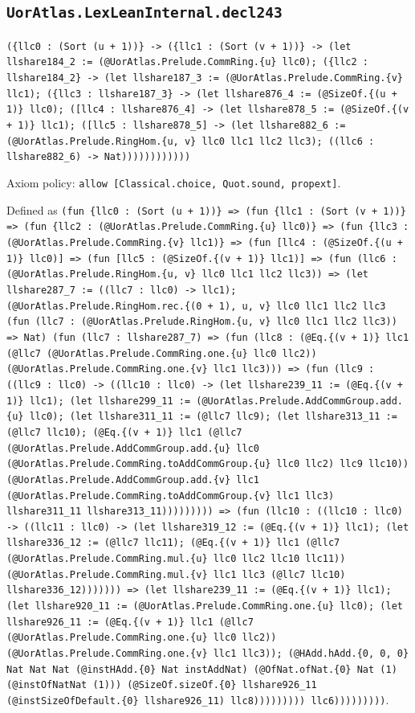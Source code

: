 \documentclass[11pt]{article}
\begin{document}
\subsection*{\texttt{UorAtlas.LexLeanInternal.decl243}}
\noindent\texttt{(\{llc0 : (Sort (u + 1))\} -> (\{llc1 : (Sort (v + 1))\} -> (let llshare184\_2 := (@UorAtlas.Prelude.CommRing.\{u\} llc0); (\{llc2 : llshare184\_2\} -> (let llshare187\_3 := (@UorAtlas.Prelude.CommRing.\{v\} llc1); (\{llc3 : llshare187\_3\} -> (let llshare876\_4 := (@SizeOf.\{(u + 1)\} llc0); ([llc4 : llshare876\_4] -> (let llshare878\_5 := (@SizeOf.\{(v + 1)\} llc1); ([llc5 : llshare878\_5] -> (let llshare882\_6 := (@UorAtlas.Prelude.RingHom.\{u, v\} llc0 llc1 llc2 llc3); ((llc6 : llshare882\_6) -> Nat))))))))))))}\par
\noindent Axiom policy: \texttt{allow [Classical.choice, Quot.sound, propext]}.\par
\noindent Defined as \texttt{(fun \{llc0 : (Sort (u + 1))\} => (fun \{llc1 : (Sort (v + 1))\} => (fun \{llc2 : (@UorAtlas.Prelude.CommRing.\{u\} llc0)\} => (fun \{llc3 : (@UorAtlas.Prelude.CommRing.\{v\} llc1)\} => (fun [llc4 : (@SizeOf.\{(u + 1)\} llc0)] => (fun [llc5 : (@SizeOf.\{(v + 1)\} llc1)] => (fun (llc6 : (@UorAtlas.Prelude.RingHom.\{u, v\} llc0 llc1 llc2 llc3)) => (let llshare287\_7 := ((llc7 : llc0) -> llc1); (@UorAtlas.Prelude.RingHom.rec.\{(0 + 1), u, v\} llc0 llc1 llc2 llc3 (fun (llc7 : (@UorAtlas.Prelude.RingHom.\{u, v\} llc0 llc1 llc2 llc3)) => Nat) (fun (llc7 : llshare287\_7) => (fun (llc8 : (@Eq.\{(v + 1)\} llc1 (@llc7 (@UorAtlas.Prelude.CommRing.one.\{u\} llc0 llc2)) (@UorAtlas.Prelude.CommRing.one.\{v\} llc1 llc3))) => (fun (llc9 : ((llc9 : llc0) -> ((llc10 : llc0) -> (let llshare239\_11 := (@Eq.\{(v + 1)\} llc1); (let llshare299\_11 := (@UorAtlas.Prelude.AddCommGroup.add.\{u\} llc0); (let llshare311\_11 := (@llc7 llc9); (let llshare313\_11 := (@llc7 llc10); (@Eq.\{(v + 1)\} llc1 (@llc7 (@UorAtlas.Prelude.AddCommGroup.add.\{u\} llc0 (@UorAtlas.Prelude.CommRing.toAddCommGroup.\{u\} llc0 llc2) llc9 llc10)) (@UorAtlas.Prelude.AddCommGroup.add.\{v\} llc1 (@UorAtlas.Prelude.CommRing.toAddCommGroup.\{v\} llc1 llc3) llshare311\_11 llshare313\_11))))))))) => (fun (llc10 : ((llc10 : llc0) -> ((llc11 : llc0) -> (let llshare319\_12 := (@Eq.\{(v + 1)\} llc1); (let llshare336\_12 := (@llc7 llc11); (@Eq.\{(v + 1)\} llc1 (@llc7 (@UorAtlas.Prelude.CommRing.mul.\{u\} llc0 llc2 llc10 llc11)) (@UorAtlas.Prelude.CommRing.mul.\{v\} llc1 llc3 (@llc7 llc10) llshare336\_12))))))) => (let llshare239\_11 := (@Eq.\{(v + 1)\} llc1); (let llshare920\_11 := (@UorAtlas.Prelude.CommRing.one.\{u\} llc0); (let llshare926\_11 := (@Eq.\{(v + 1)\} llc1 (@llc7 (@UorAtlas.Prelude.CommRing.one.\{u\} llc0 llc2)) (@UorAtlas.Prelude.CommRing.one.\{v\} llc1 llc3)); (@HAdd.hAdd.\{0, 0, 0\} Nat Nat Nat (@instHAdd.\{0\} Nat instAddNat) (@OfNat.ofNat.\{0\} Nat (1) (@instOfNatNat (1))) (@SizeOf.sizeOf.\{0\} llshare926\_11 (@instSizeOfDefault.\{0\} llshare926\_11) llc8))))))))) llc6)))))))))}.\par
\end{document}
